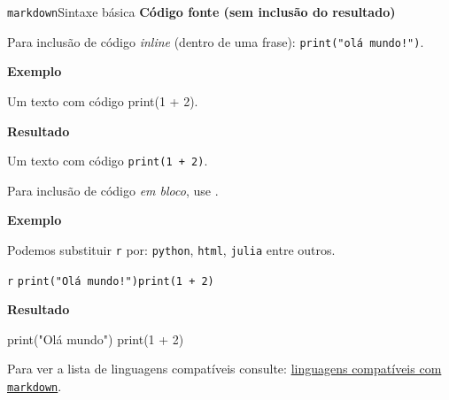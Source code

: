 \documentclass[
  10pt,
  ignorenonframetext,
]{beamer}
\newenvironment{Shaded}{\begin{snugshade}}{\end{snugshade}}
\newcommand{\DecValTok}[1]{\textcolor[rgb]{0.68,0.00,0.00}{#1}}
\newcommand{\FunctionTok}[1]{\textcolor[rgb]{0.28,0.35,0.67}{#1}}
\newcommand{\InformationTok}[1]{\textcolor[rgb]{0.37,0.37,0.37}{#1}}
\newcommand{\NormalTok}[1]{\textcolor[rgb]{0.00,0.23,0.31}{#1}}
\newcommand{\SpecialCharTok}[1]{\textcolor[rgb]{0.37,0.37,0.37}{#1}}
\newcommand{\StringTok}[1]{\textcolor[rgb]{0.13,0.47,0.30}{#1}}
\begin{document}
\begin{frame}[fragile]{\texttt{markdown}\newline Sintaxe básica}
\protect\hypertarget{markdownsintaxe-buxe1sica-11}{}
\textbf{Código fonte (sem inclusão do resultado)}

Para inclusão de código \emph{inline} (dentro de uma frase):
\texttt{\textasciigrave{}print("olá\ mundo!")\textasciigrave{}}.

\textbf{Exemplo}

\begin{Shaded}
\begin{Highlighting}[]
\NormalTok{Um texto com código }\InformationTok{\textasciigrave{}print(1 + 2)\textasciigrave{}}\NormalTok{.}
\end{Highlighting}
\end{Shaded}

\textbf{Resultado}

Um texto com código \texttt{print(1\ +\ 2)}.
\end{frame}

\begin{frame}[fragile]
Para inclusão de código \emph{em bloco}, use
\texttt{\textasciigrave{}\textasciigrave{}\textasciigrave{}}.

\textbf{Exemplo}

Podemos substituir \texttt{r} por: \texttt{python}, \texttt{html},
\texttt{julia} entre outros.

\texttt{\textasciigrave{}\textasciigrave{}\textasciigrave{}r}\newline
\texttt{print("Olá\ mundo!")}\newline \texttt{print(1\ +\ 2)}\newline
\texttt{\textasciigrave{}\textasciigrave{}\textasciigrave{}}

\textbf{Resultado}

\begin{Shaded}
\begin{Highlighting}[]
\FunctionTok{print}\NormalTok{(}\StringTok{"Olá mundo"}\NormalTok{)}
\FunctionTok{print}\NormalTok{(}\DecValTok{1} \SpecialCharTok{+} \DecValTok{2}\NormalTok{)}
\end{Highlighting}
\end{Shaded}

Para ver a lista de linguagens compatíveis consulte:
\href{https://github.com/jgm/skylighting/tree/master/skylighting-core/xml}{linguagens
compatíveis com \texttt{markdown}}.
\end{frame}
\end{document}
